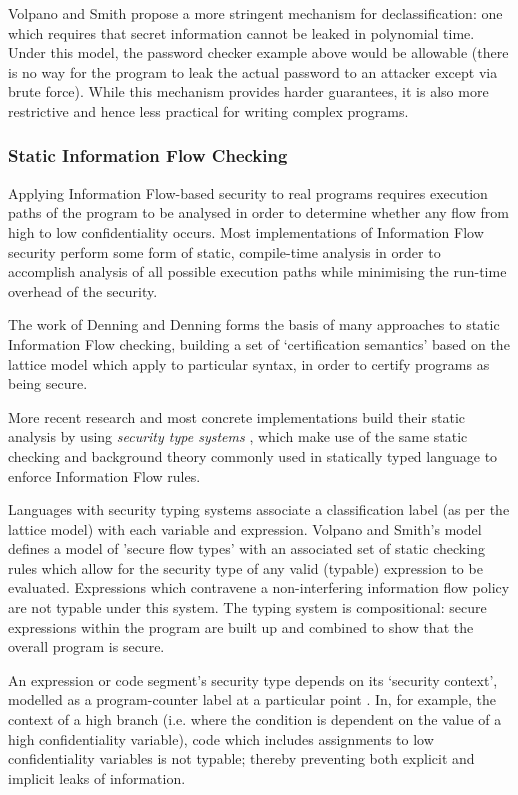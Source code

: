 Volpano and Smith \cite{volpano2000declassification} propose a more stringent mechanism for declassification: one which requires that secret information cannot be leaked in polynomial time. Under this model, the password checker example above would be allowable (there is no way for the program to leak the actual password to an attacker except via brute force). While this mechanism provides harder guarantees, it is also more restrictive \cite{zdancewic2004challenges} and hence less practical for writing complex programs.

\subsubsection{Static Information Flow Checking}

Applying Information Flow-based security to real programs requires execution paths of the program to be analysed in order to determine whether any flow from high to low confidentiality occurs. Most implementations of Information Flow security perform some form of static, compile-time analysis in order to accomplish analysis of all possible execution paths while minimising the run-time overhead of the security.

The work of Denning and Denning \cite{denning1977if} forms the basis of many approaches to static Information Flow checking, building a set of `certification semantics' based on the lattice model which apply to particular syntax, in order to certify programs as being secure.

More recent research and most concrete implementations build their static analysis by using \textit{security type systems} \cite{sabelfeld2003if}, which make use of the same static checking and background theory commonly used in statically typed language to enforce Information Flow rules.

Languages with security typing systems associate a classification label (as per the lattice model) with each variable and expression. Volpano and Smith's model \cite{volpano1996sectype} defines a model of 'secure flow types' with an associated set of static checking rules which allow for the security type of any valid (typable) expression to be evaluated. Expressions which contravene a non-interfering information flow policy are not typable under this system. The typing system is compositional: secure expressions within the program are built up and combined to show that the overall program is secure.

An expression or code segment's security type depends on its `security context', modelled as a program-counter label at a particular point \cite{sabelfeld2003if}. In, for example, the context of a high branch (i.e. where the condition is dependent on the value of a high confidentiality variable), code which includes assignments to low confidentiality variables is not typable; thereby preventing both explicit and implicit leaks of information.

